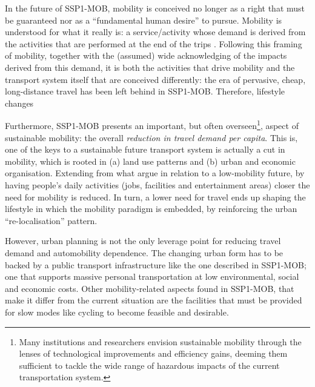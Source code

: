 In the future of SSP1-MOB, mobility is conceived no longer as a right that must be guaranteed nor as a ``fundamental human desire'' to pursue. Mobility is understood for what it really is: a service/activity whose demand is derived from the activities that are performed at the end of the trips \parencite{moriarty2008_Lowmobilityfuture}. Following this framing of mobility, together with the (assumed) wide acknowledging of the impacts derived from this demand, it is both the activities that drive mobility and the transport system itself that are conceived differently: the era of pervasive, cheap, long-distance travel has been left behind in SSP1-MOB. Therefore, lifestyle changes

Furthermore, SSP1-MOB presents an important, but often overseen\footnote{Many institutions and researchers envision sustainable mobility through the lenses of technological improvements and efficiency gains, deeming them sufficient to tackle the wide range of hazardous impacts of the current transportation system.}, aspect of sustainable mobility: the overall \emph{reduction in travel demand per capita}. This is, one of the keys to a sustainable future transport system is actually a cut in mobility, which is rooted in (a) land use patterns and (b) urban and economic organisation. Extending from what \textcite{moriarty2008_Lowmobilityfuture} argue in relation to a low-mobility future, by having people's daily activities (jobs, facilities and entertainment areas) closer the need for mobility is reduced. In turn, a lower need for travel ends up shaping the lifestyle in which the mobility paradigm is embedded, by reinforcing the urban ``re-localisation'' pattern.

However, urban planning is not the only leverage point for reducing travel demand and automobility dependence. The changing urban form has to be backed by a public transport infrastructure like the one described in SSP1-MOB; one that supports massive personal transportation at low environmental, social and economic costs. Other mobility-related aspects found in SSP1-MOB, that make it differ from the current situation are the facilities that must be provided for slow modes like cycling to become feasible and desirable.